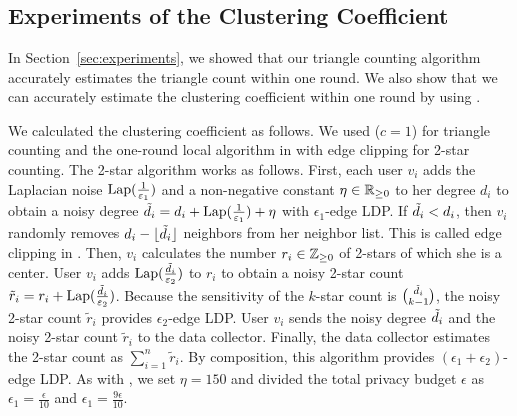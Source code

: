 \graphicspath{{./chapters/chapter3/}}
\chapter{ }

\allowdisplaybreaks[1]


\section{Experiments of the Clustering Coefficient}
\label{sec:cluster}
In Section~\ref{sec:experiments}, we showed that our triangle counting algorithm \AlgWSTriVR{} accurately estimates the triangle count within one round.
We also show that we can accurately estimate the clustering coefficient within one round by using \AlgWSTriVR{}.

We calculated the clustering coefficient as follows.
We used \AlgWSTriVR{} ($c=1$) for triangle counting and
the one-round local algorithm in \cite{Imola_USENIX21} with edge clipping \cite{Imola_USENIX22}
for 2-star counting.
The 2-star algorithm works as follows.
First, each user $v_i$ adds the Laplacian noise $\textrm{Lap}(\frac{1}{\varepsilon_1})$ and a non-negative constant $\eta \in \mathbb{R}_{\ge0}$ to her degree $d_i$ to obtain a noisy degree $\tilde{d}_i = d_i + \textrm{Lap}(\frac{1}{\varepsilon_1}) + \eta$ with $\epsilon_1$-edge LDP.
If $\tilde{d}_i < d_i$, then $v_i$ randomly removes $d_i - \lfloor \tilde{d}_i \rfloor$ neighbors from her neighbor list.
This is called edge clipping in \cite{Imola_USENIX22}.
Then, $v_i$ calculates the number $r_i \in \mathbb{Z}_{\ge0}$ of 2-stars of which she is a center.
User $v_i$ adds $\textrm{Lap}(\frac{\tilde{d}_i}{\varepsilon_2})$ to $r_i$ to obtain a noisy 2-star count $\tilde{r}_i = r_i + \textrm{Lap}(\frac{\tilde{d}_i}{\varepsilon_2})$.
Because the sensitivity of the $k$-star count is $\binom{\tilde{d}_i}{k-1}$, the noisy 2-star count $\tilde{r}_i$ provides $\epsilon_2$-edge LDP.
User $v_i$ sends the noisy degree $\tilde{d}_i$ and the noisy 2-star count $\tilde{r}_i$ to the data collector.
Finally, the data collector estimates the 2-star count as $\sum_{i=1}^n \tilde{r}_i$.
By composition, this algorithm provides $(\epsilon_1 + \epsilon_2)$-edge LDP.
As with \cite{Imola_USENIX22}, we set $\eta = 150$ and divided the total privacy budget $\epsilon$ as $\epsilon_1 = \frac{\epsilon}{10}$ and $\epsilon_1 = \frac{9\epsilon}{10}$.

